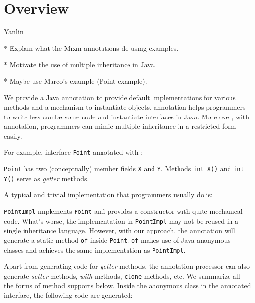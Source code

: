 \section{Overview}\label{sec:ep}
Yanlin

* Explain what the Mixin annotations do using examples.

* Motivate the use of multiple inheritance in Java.

* Maybe use Marco's example (Point example).

We provide a Java annotation \mixin to provide default implementations for
various methods and a mechanism to instantiate objects. \mixin annotation helps
programmers to write less cumbersome code and instantiate interfaces in
Java. More over, with \mixin annotation, programmers can mimic multiple
inheritance in a restricted form easily.

For example, interface \texttt{Point} annotated with \mixin:


\texttt{Point} has two (conceptually) member fields \texttt{X} and
\texttt{Y}. Methods \texttt{int X()} and \texttt{int Y()} serve as \emph{getter}
methods. %

A typical and trivial implementation that programmers usually do is:


\texttt{PointImpl} implements \texttt{Point} and provides a constructor with
quite mechanical code. What's worse, the implementation in \texttt{PointImpl}
may not be reused in a single inheritance language. However, with our approach,
the \mixin annotation will generate a static method \texttt{of} inside
\texttt{Point}. \texttt{of} makes use of Java anonymous classes and achieves the
same implementation as \texttt{PointImpl}.


Apart from generating code for \emph{getter} methods, the annotation processor
can also generate \emph{setter} methods, \emph{with} methods, \texttt{clone}
methods, etc. We summarize all the forms of method \mixin  supports below. Inside
the anonymous class in the annotated interface, the following code are
generated:

